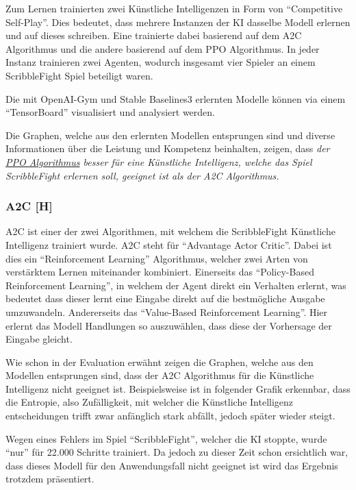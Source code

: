 Zum Lernen trainierten zwei Künstliche Intelligenzen in Form von ``Competitive Self-Play''. Dies bedeutet,
dass mehrere Instanzen der KI dasselbe Modell erlernen und auf dieses schreiben. Eine trainierte dabei basierend auf dem
A2C Algorithmus und die andere basierend auf dem PPO Algorithmus. In jeder Instanz trainieren zwei Agenten,
wodurch insgesamt vier Spieler an einem ScribbleFight Spiel beteiligt waren.

Die mit OpenAI-Gym und Stable Baselines3 erlernten Modelle können via einem ``TensorBoard'' visualisiert und analysiert werden.

Die Graphen, welche aus den erlernten Modellen entsprungen sind und diverse Informationen über die Leistung und Kompetenz beinhalten,
zeigen, dass \textit{der \underline{PPO Algorithmus} besser für eine Künstliche Intelligenz, welche das Spiel ScribbleFight erlernen soll, geeignet ist als der A2C Algorithmus.}

\subsubsection{A2C [H]}

A2C ist einer der zwei Algorithmen, mit welchem die ScribbleFight Künstliche Intelligenz trainiert wurde.
A2C steht für ``Advantage Actor Critic''. Dabei ist dies ein ``Reinforcement Learning'' Algorithmus, welcher
zwei Arten von verstärktem Lernen miteinander kombiniert. Einerseits das ``Policy-Based Reinforcement Learning'', in welchem
der Agent direkt ein Verhalten erlernt, was bedeutet dass dieser lernt eine Eingabe direkt auf die bestmögliche Ausgabe umzuwandeln.
Andererseits das ``Value-Based Reinforcement Learning''. Hier erlernt das Modell Handlungen so auszuwählen, dass
diese der Vorhersage der Eingabe gleicht.

Wie schon in der Evaluation erwähnt zeigen die Graphen, welche aus den Modellen entsprungen sind, dass der A2C Algorithmus für
die Künstliche Intelligenz nicht geeignet ist. Beispielsweise ist in folgender Grafik erkennbar, dass die Entropie, also Zufälligkeit, mit welcher die Künstliche Intelligenz
entscheidungen trifft zwar anfänglich stark abfällt, jedoch später wieder steigt.

Wegen eines Fehlers im Spiel ``ScribbleFight'', welcher die KI stoppte, wurde ``nur'' für 22.000 Schritte trainiert.
Da jedoch zu dieser Zeit schon ersichtlich war, dass dieses Modell für den Anwendungsfall nicht geeignet ist wird das Ergebnis trotzdem präsentiert.

